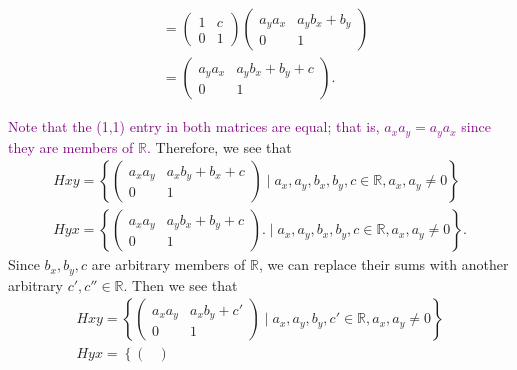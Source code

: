 \begin{description}
\begin{minipage}{0.5\textwidth}
\begin{align*}
            &= 
            \begin{pmatrix}
                1 & c \\
                0 & 1    
            \end{pmatrix}
            \begin{pmatrix}
                a_ya_x & a_yb_x+ b_y \\
                0 & 1    
            \end{pmatrix}\\
            &= 
            \begin{pmatrix}
                a_ya_x & a_yb_x + b_y + c \\
                0 & 1    
            \end{pmatrix}.
        \end{align*}
    \end{minipage}
    \textcolor{purple}{Note that the (1,1) entry in both matrices are
    equal; that is, $a_xa_y = a_ya_x$ since they are members of
    $\mathbb{R}$.}
    Therefore, we see that 
    \begin{align*}
        Hxy = 
        \left\{ 
        \begin{pmatrix}
            a_xa_y & a_xb_y + b_x + c \\
            0 & 1    
        \end{pmatrix}
        \mid 
        a_x,a_y,b_x,b_y, c \in \mathbb{R}, a_x, a_y \ne 0
        \right \}\\
        Hyx = \left\{
        \begin{pmatrix}
            a_xa_y & a_yb_x + b_y + c \\
            0 & 1    
        \end{pmatrix}.
        \mid 
        a_x,a_y,b_x,b_y, c \in \mathbb{R}, a_x, a_y \ne 0
        \right\}.
    \end{align*}
    Since $b_x, b_y, c$ are arbitrary members of $\mathbb{R}$, we can
    replace their sums with another arbitrary $c', c'' \in \mathbb{R}$.
    Then we see that 
    \begin{align*}
        Hxy = 
        \left\{ 
        \begin{pmatrix}
            a_xa_y & a_xb_y +c' \\
            0 & 1    
        \end{pmatrix}
        \mid 
        a_x,a_y,b_y, c' \in \mathbb{R}, a_x, a_y \ne 0
        \right \}\\
        Hyx = \left\{
        \begin{pmatrix}

\end{pmatrix}
\end{align*}
\end{description}
